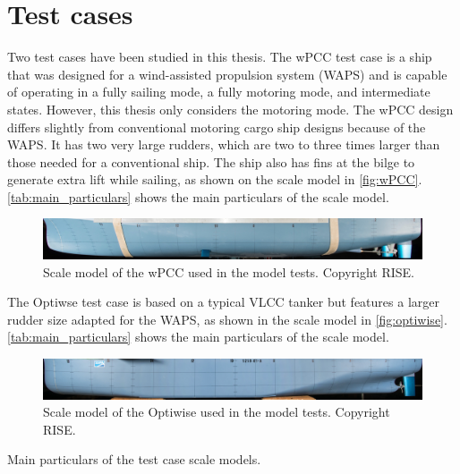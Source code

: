\section{Test cases} \label{sec:test_cases}
Two test cases have been studied in this thesis. The wPCC test case is a ship that was designed for a wind-assisted propulsion system (WAPS) and is capable of operating in a fully sailing mode, a fully motoring mode, and intermediate states. 
However, this thesis only considers the motoring mode. The wPCC design differs slightly from conventional motoring cargo ship designs because of the WAPS. It has two very large rudders, which are two to three times larger than those needed for a conventional ship. The ship also has fins at the bilge to generate extra lift while sailing, as shown on the scale model in \autoref{fig:wPCC}.
\autoref{tab:main_particulars} shows the main particulars of the scale model. 
\begin{figure}[h]
    \centering
    \includegraphics[width=\columnwidth]{figures/5m2.jpg}
    \caption{Scale model of the wPCC used in the model tests. Copyright RISE.}
    \label{fig:wPCC}
\end{figure}

The Optiwse test case is based on a typical VLCC tanker but features a larger rudder size adapted for the WAPS, as shown in the scale model in \autoref{fig:optiwise}. \autoref{tab:main_particulars} shows the main particulars of the scale model. 
\begin{figure}[h]
    \centering
    \includegraphics[width=\columnwidth]{figures/optiwise.jpg}
    \caption{Scale model of the Optiwise used in the model tests. Copyright RISE.}
    \label{fig:optiwise}
\end{figure}
\begin{table}[h]
    \centering
    \caption{Main particulars of the test case scale models.}
    \label{tab:main_particulars}
\end{table}